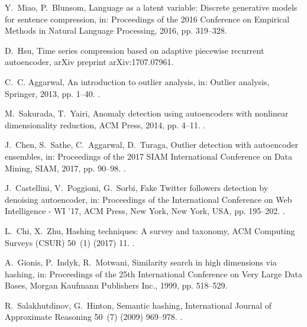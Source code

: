 \documentclass[preprint,5p,compress]{elsarticle}
\begin{document}
\begin{thebibliography}{100}
Y.~Miao, P.~Blunsom, Language as a latent variable: Discrete generative models
  for sentence compression, in: Proceedings of the 2016 Conference on Empirical
  Methods in Natural Language Processing, 2016, pp. 319--328.

D.~Hsu, Time series compression based on adaptive piecewise recurrent
  autoencoder, arXiv preprint arXiv:1707.07961.

C.~C. Aggarwal, An introduction to outlier analysis, in: Outlier analysis,
  Springer, 2013, pp. 1--40.
\newblock \href {http://dx.doi.org/978-3-319-47578-3\_1}
  {}.

M.~Sakurada, T.~Yairi, Anomaly detection using autoencoders with nonlinear
  dimensionality reduction, {ACM} Press, 2014, pp. 4--11.
\newblock \href {http://dx.doi.org/10.1145/2689746.2689747}
  {}.

J.~Chen, S.~Sathe, C.~Aggarwal, D.~Turaga, Outlier detection with autoencoder
  ensembles, in: Proceedings of the 2017 SIAM International Conference on Data
  Mining, SIAM, 2017, pp. 90--98.
\newblock \href {http://dx.doi.org/10.1137/1.9781611974973.11}
  {}.

J.~Castellini, V.~Poggioni, G.~Sorbi, {Fake Twitter followers detection by
  denoising autoencoder}, in: Proceedings of the International Conference on
  Web Intelligence - WI '17, ACM Press, New York, New York, USA, pp. 195--202.
\newblock \href {http://dx.doi.org/10.1145/3106426.3106489}
  {}.

L.~Chi, X.~Zhu, Hashing techniques: A survey and taxonomy, ACM Computing
  Surveys (CSUR) 50~(1) (2017) 11.
\newblock \href {http://dx.doi.org/10.1145/3047307}
  {}.

A.~Gionis, P.~Indyk, R.~Motwani, Similarity search in high dimensions via
  hashing, in: Proceedings of the 25th International Conference on Very Large
  Data Bases, Morgan Kaufmann Publishers Inc., 1999, pp. 518--529.

R.~Salakhutdinov, G.~Hinton, Semantic hashing, International Journal of
  Approximate Reasoning 50~(7) (2009) 969--978.
\newblock \href {http://dx.doi.org/10.1016/j.ijar.2008.11.006}
  {}.


\end{thebibliography}
\end{document}
